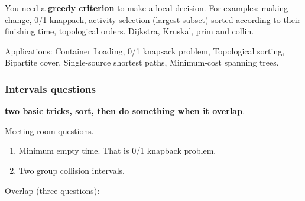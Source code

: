\documentclass[a4paper,11pt,twoside]{book}
\begin{document}
\par	You need a \textbf{greedy criterion} to make a local decision. For examples: making change, 0/1 knappack,  activity selection (largest subset) sorted according to their finishing time, topological orders. Dijkstra, Kruskal, prim and collin.

\par Applications: Container Loading, 0/1 knapsack problem, Topological sorting, Bipartite cover, Single-source shortest paths, Minimum-cost spanning trees. 


\subsubsection{Intervals questions}

	\par \textbf{two basic tricks, sort, then do something when it overlap}.

	\par Meeting room questions. 
	\begin{enumerate}
		\item Minimum empty time. That is 0/1 knapback problem.
		\item Two group collision intervals.
	\end{enumerate}
	

	\par Overlap (three questions):
	
\end{document}
